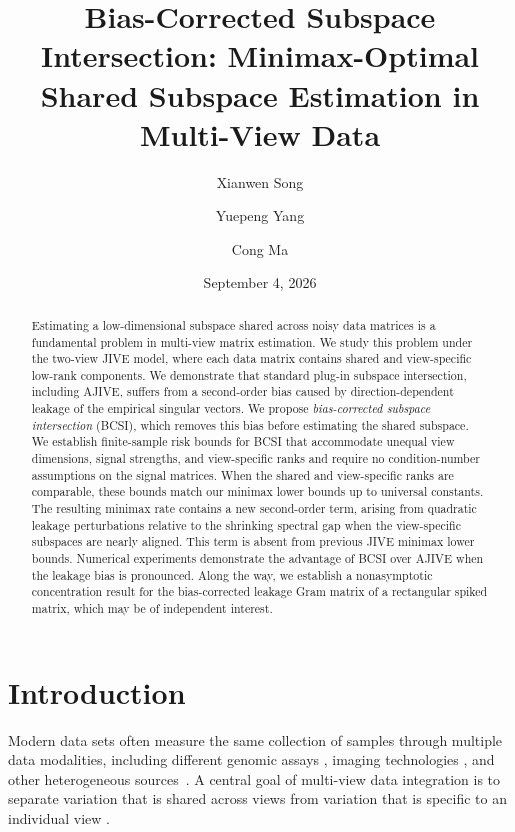 \documentclass[11pt]{article}
\title{Bias-Corrected Subspace Intersection: Minimax-Optimal Shared Subspace Estimation in Multi-View Data}
\author[1]{Xianwen Song}
\author[2]{Yuepeng Yang}
\author[1]{Cong Ma}
\affil[1]{Department of Statistics, University of Chicago}
\affil[2]{Department of Statistics and Data Science, the Wharton School, University of Pennsylvania}
\date{September 4, 2026}
\begin{document}
\maketitle
\begingroup
\renewcommand{\thefootnote}{}
\endgroup




\begin{abstract}
Estimating a low-dimensional subspace shared across noisy data matrices is a fundamental problem in multi-view matrix estimation.
We study this problem under the two-view JIVE model, where each data matrix contains shared and view-specific low-rank components.
We demonstrate that standard {plug-in} subspace intersection, including AJIVE, suffers from a second-order bias caused by direction-dependent leakage of the empirical singular vectors.
We propose \emph{bias-corrected subspace intersection} (BCSI), which removes this bias before estimating the shared subspace.
We establish finite-sample risk bounds for BCSI that accommodate unequal view dimensions, signal strengths, and view-specific ranks and require no condition-number assumptions on the signal matrices.
When the shared and view-specific ranks are comparable, these bounds match our minimax lower bounds up to universal constants.
The resulting minimax rate contains a new second-order term, arising from quadratic leakage perturbations relative to the shrinking spectral gap when the view-specific subspaces are nearly aligned. This term is absent from previous JIVE minimax lower bounds. 
Numerical experiments demonstrate the advantage of BCSI over AJIVE when the leakage bias is pronounced. 
Along the way, we establish a nonasymptotic concentration result for the bias-corrected leakage Gram matrix of a rectangular spiked matrix, which may be of independent interest.
\end{abstract}



\section{Introduction}
\label{sec:introduction}

Modern data sets often measure the same collection of samples through
multiple data modalities, including different genomic assays
\citep{lock2013joint}, imaging technologies
\citep{zhao2021multimodal}, and other heterogeneous sources~\citep{Shi2023}. A central goal
of multi-view data integration is to separate variation that is shared across
views from variation that is specific to an individual view
\citep{lock2013joint,Feng2018,gaynanova2019structural,prothero2024data,gui2025indiseek}.
\end{document}
